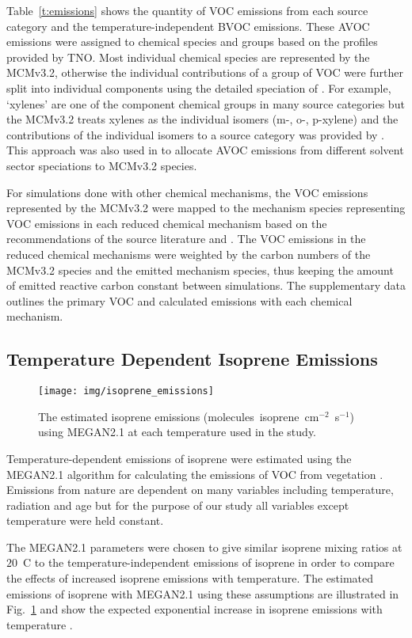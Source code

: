Table~\ref{t:emissions} shows the quantity of VOC emissions from each source category and the temperature-independent BVOC emissions.
These AVOC emissions were assigned to chemical species and groups based on the profiles provided by TNO.
Most individual chemical species are represented by the MCMv3.2, otherwise the individual contributions of a group of VOC were further split into individual components using the detailed speciation of \citet{Passant:2002}.
For example, `xylenes' are one of the component chemical groups in many source categories but the MCMv3.2 treats xylenes as the individual isomers (m-, o-, p-xylene) and the contributions of the individual isomers to a source category was provided by \citet{Passant:2002}.
This approach was also used in \citet{vonSchneidemesser:2016} to allocate AVOC emissions from different solvent sector speciations to MCMv3.2 species.

For simulations done with other chemical mechanisms, the VOC emissions represented by the MCMv3.2 were mapped to the mechanism species representing VOC emissions in each reduced chemical mechanism based on the recommendations of the source literature and \citet{Carter:2015}.
The VOC emissions in the reduced chemical mechanisms were weighted by the carbon numbers of the MCMv3.2 species and the emitted mechanism species, thus keeping the amount of emitted reactive carbon constant between simulations. 
The supplementary data outlines the primary VOC and calculated emissions with each chemical mechanism.

\subsection{Temperature Dependent Isoprene Emissions} \label{ss:megan}
\begin{figure}[t]%
    \centering%
    \caption{The estimated isoprene emissions (molecules~isoprene~cm$^{-2}$~s$^{-1}$) using MEGAN2.1 at each temperature used in the study.}
    \label{f:isoprene_emissions}%
    \texttt{[image: img/isoprene\_emissions]}
\end{figure}
Temperature-dependent emissions of isoprene were estimated using the MEGAN2.1 algorithm for calculating the emissions of VOC from vegetation \citep{Guenther:2012}.
Emissions from nature are dependent on many variables including temperature, radiation and age but for the purpose of our study all variables except temperature were held constant.

The MEGAN2.1 parameters were chosen to give similar isoprene mixing ratios at $20$~\degree C to the temperature-independent emissions of isoprene in order to compare the effects of increased isoprene emissions with temperature.
The estimated emissions of isoprene with MEGAN2.1 using these assumptions are illustrated in Fig.~\ref{f:isoprene_emissions} and show the expected exponential increase in isoprene emissions with temperature \citep{Guenther:2006}.

